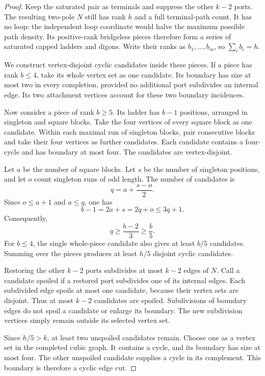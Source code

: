 \begin{proof}
Keep the saturated pair as terminals and suppress the other $k-2$ ports.
The resulting two-pole $N$ still has rank $h$ and a full terminal-path count.
It has no loop: the independent loop coordinate would halve the maximum possible path density.
Its positive-rank bridgeless pieces therefore form a series of saturated capped ladders and digons.
Write their ranks as $b_1,\ldots,b_m$, so $\sum_i b_i=h$.

We construct vertex-disjoint cyclic candidates inside these pieces.
If a piece has rank $b\le4$, take its whole vertex set as one candidate.
Its boundary has size at most two in every completion, provided no additional port subdivides an internal edge.
Its two attachment vertices account for these two boundary incidences.

Now consider a piece of rank $b\ge5$.
Its ladder has $b-1$ positions, arranged in singleton and square blocks.
Take the four vertices of every square block as one candidate.
Within each maximal run of singleton blocks, pair consecutive blocks and take their four vertices as further candidates.
Each candidate contains a four-cycle and has boundary at most four.
The candidates are vertex-disjoint.

Let $a$ be the number of square blocks.
Let $s$ be the number of singleton positions, and let $o$ count singleton runs of odd length.
The number of candidates is
\[
 q=a+\frac{s-o}{2}.
\]
Since $o\le a+1$ and $a\le q$, one has
\[
 b-1=2a+s=2q+o\le3q+1.
\]
Consequently,
\[
 q\ge\frac{b-2}{3}\ge\frac b5.
\]
For $b\le4$, the single whole-piece candidate also gives at least $b/5$ candidates.
Summing over the pieces produces at least $h/5$ disjoint cyclic candidates.

Restoring the other $k-2$ ports subdivides at most $k-2$ edges of $N$.
Call a candidate spoiled if a restored port subdivides one of its internal edges.
Each subdivided edge spoils at most one candidate, because their vertex sets are disjoint.
Thus at most $k-2$ candidates are spoiled.
Subdivisions of boundary edges do not spoil a candidate or enlarge its boundary.
The new subdivision vertices simply remain outside its selected vertex set.

Since $h/5>k$, at least two unspoiled candidates remain.
Choose one as a vertex set in the completed cubic graph.
It contains a cycle, and its boundary has size at most four.
The other unspoiled candidate supplies a cycle in its complement.
This boundary is therefore a cyclic edge cut.
\end{proof}

